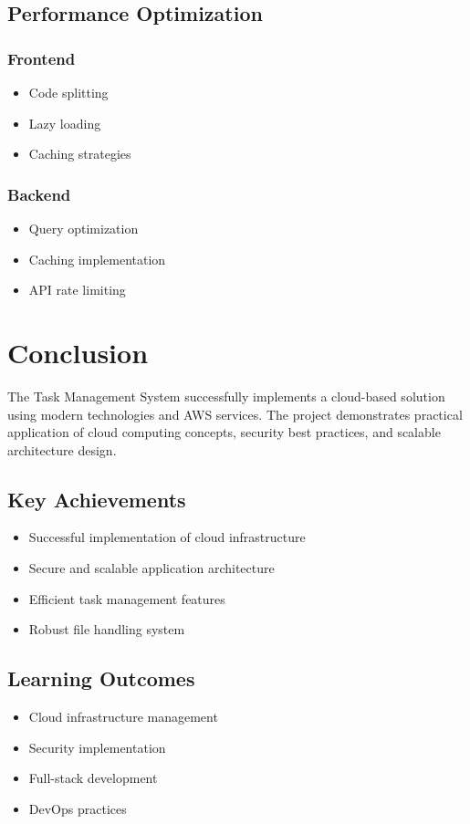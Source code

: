 \documentclass[12pt,a4paper]{article}
\begin{document}
\subsection{Performance Optimization}

\subsubsection{Frontend}
\begin{itemize}
    \item Code splitting
    \item Lazy loading
    \item Caching strategies
\end{itemize}

\subsubsection{Backend}
\begin{itemize}
    \item Query optimization
    \item Caching implementation
    \item API rate limiting
\end{itemize}

\section{Conclusion}

The Task Management System successfully implements a cloud-based solution using modern technologies and AWS services. The project demonstrates practical application of cloud computing concepts, security best practices, and scalable architecture design.

\subsection{Key Achievements}
\begin{itemize}
    \item Successful implementation of cloud infrastructure
    \item Secure and scalable application architecture
    \item Efficient task management features
    \item Robust file handling system
\end{itemize}

\subsection{Learning Outcomes}
\begin{itemize}
    \item Cloud infrastructure management
    \item Security implementation
    \item Full-stack development
    \item DevOps practices
\end{itemize}
\end{document}
